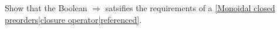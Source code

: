 
Show that the Boolean $\Rightarrow$  satsifies the requirements of a \ref{Monoidal closed preorders|closure operator|referenced}.